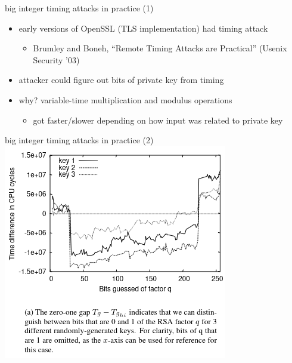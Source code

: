 \begin{frame}{big integer timing attacks in practice (1)}
    \begin{itemize}
    \item early versions of OpenSSL (TLS implementation) had timing attack
        \begin{itemize}
        \item Brumley and Boneh, ``Remote Timing Attacks are Practical'' (Usenix Security '03)
        \end{itemize}
    \item attacker could figure out bits of private key from timing
    \vspace{.5cm}
    \item why? variable-time multiplication and modulus operations
        \begin{itemize}
        \item got faster/slower depending on how input was related to private key
        \end{itemize}
    \end{itemize}
\end{frame}

\begin{frame}{big integer timing attacks in practice (2)}
    \includegraphics[height=0.9\textheight]{../spectre/remote-timing-prac-fig3a}
\end{frame}
